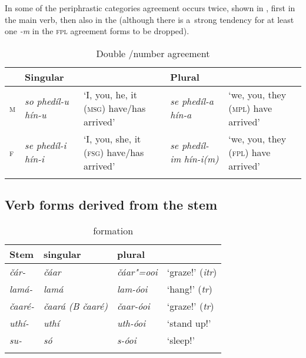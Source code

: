 In some of the periphrastic categories agreement occurs twice, shown in , first in the main verb, then also in the  (although there is a~strong tendency for at least one \textit{-m} in the \textsc{fpl} agreement forms to be dropped).


\begin{table}[p]
\caption{Double /number agreement}

\begin{tabularx}{\textwidth}{ l P{20mm} Q P{20mm} Q }
\lsptoprule
&
Singular &
&
Plural &
\\\midrule
\textsc{m} &
\textit{so phedíl-u hín-u} &
`I, you, he, it (\textsc{msg}) have/has arrived' &
\textit{se phedíl-a hín-a} &
`we, you, they (\textsc{mpl}) have arrived'\\
\textsc{f} &
\textit{se phedíl-i hín-i} &
`I, you, she, it (\textsc{fsg}) have/has arrived' &
\textit{se phedíl-im}
\textit{hín-i(m)} &
`we, you, they (\textsc{fpl}) have arrived'\\\lspbottomrule
\end{tabularx}
\label{tab:8-21}
\end{table}


\subsection{Verb forms derived from the  stem}
\label{subsec:8-4-2}



\begin{table}
\caption{ formation}
\begin{tabularx}{\textwidth}{ Q l@{\hspace{20pt}} l@{\hspace{20pt}} Q }
\lsptoprule
Stem &
 singular &
 plural &
\\\midrule
\textit{čár-} &
\textit{čáar} &
\textit{čáar"=ooi} &
`graze!' (\textit{itr})\\
\textit{lamá-} &
\textit{lamá} &
\textit{lam-óoi} &
`hang!' (\textit{tr})\\
\textit{čaaré-} &
\textit{čaará (B čaaré)} &
\textit{čaar-óoi} &
`graze!' (\textit{tr})\\
\textit{uthí-} &
\textit{uthí} &
\textit{uth-óoi} &
`stand up!'\\
\textit{su-} &
\textit{só} &
\textit{s-óoi} &
`sleep!'\\\lspbottomrule
\end{tabularx}
\label{tab:8-22}
\end{table}



